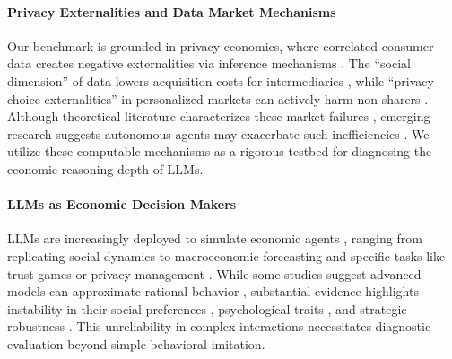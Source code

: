 \documentclass[sigconf,anonymous,review]{acmart}
\theoremstyle{definition}
\begin{document}
\paragraph{Privacy Externalities and Data Market Mechanisms}
Our benchmark is grounded in privacy economics, where correlated consumer data creates negative externalities via inference mechanisms \cite{acemoglu2022too, ichihashi2021economics, choi2019privacy}. The ``social dimension'' of data lowers acquisition costs for intermediaries \cite{bergemann2022economics, bergemann2019markets}, while ``privacy-choice externalities'' in personalized markets can actively harm non-sharers \cite{rhodes2024personalization, baik2023price}. Although theoretical literature characterizes these market failures \cite{goldfarb2023economics, acquisti2016economics, fainmesser2023digital}, emerging research suggests autonomous agents may exacerbate such inefficiencies \cite{sashihara2025llm, zhang2025fairshare, fish2024algorithmic}. We utilize these computable mechanisms as a rigorous testbed for diagnosing the economic reasoning depth of LLMs.

\paragraph{LLMs as Economic Decision Makers}
LLMs are increasingly deployed to simulate economic agents \cite{gao2024large}, ranging from replicating social dynamics \cite{park2023generative, aher2023using, wang2025user} to macroeconomic forecasting \cite{horton2023large, li2023econagent} and specific tasks like trust games \cite{xie2024can} or privacy management \cite{sun2024empowering, williams2023epidemic}. While some studies suggest advanced models can approximate rational behavior \cite{guo2023gpt, li2024econagent}, substantial evidence highlights instability in their social preferences \cite{hu2025generative, lee2024language}, psychological traits \cite{petrov2024limited}, and strategic robustness \cite{ma2024game, wang2025limits}. This unreliability in complex interactions necessitates diagnostic evaluation beyond simple behavioral imitation.
\end{document}
